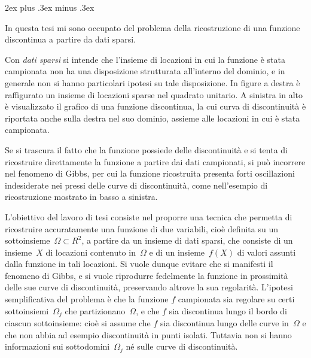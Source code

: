 \def\R{R}

\parindent 0pt
\parskip 2ex plus .3ex minus .3ex

In questa tesi mi sono occupato del problema della ricostruzione di una funzione discontinua a partire da dati sparsi.

Con {\em dati sparsi} si intende che l'insieme di locazioni in cui la funzione è stata campionata non ha una disposizione strutturata all'interno del dominio, e in generale non si hanno particolari ipotesi su tale disposizione. In figure a destra è raffigurato un insieme di locazioni sparse nel quadrato unitario.
A sinistra in alto è visualizzato il grafico di una funzione discontinua, la cui curva di discontinuità è riportata anche sulla destra nel suo dominio, assieme alle locazioni in cui è stata campionata. 

Se si trascura il fatto che la funzione possiede delle discontinuità e si tenta di ricostruire direttamente la funzione a partire dai dati campionati, si può incorrere nel fenomeno di Gibbs, per cui la funzione ricostruita presenta forti oscillazioni indesiderate nei pressi delle curve di discontinuità, come nell'esempio di ricostruzione mostrato in basso a sinistra.  



L'obiettivo del lavoro di tesi consiste nel proporre una tecnica che permetta di ricostruire accuratamente una funzione di due variabili, cioè definita su un sottoinsieme~$\Omega\subset\R^2$, a partire da un insieme di dati sparsi, che consiste di un insieme~$X$ di locazioni contenuto in~$\Omega$ e di un insieme~$f(X)$ di valori assunti dalla funzione in tali locazioni.  Si vuole dunque evitare che si manifesti il fenomeno di Gibbs, e si vuole riprodurre fedelmente la funzione in prossimità delle sue curve di discontinuità, preservando altrove la sua regolarità.  L'ipotesi semplificativa del problema è che la funzione $f$ campionata sia regolare su certi sottoinsiemi~$\Omega_j$ che partizionano~$\Omega$, e che $f$ sia discontinua lungo il bordo di ciascun sottoinsieme:  cioè si assume che $f$ sia discontinua lungo delle curve in~$\Omega$ e che non abbia ad esempio discontinuità in punti isolati.  Tuttavia non si hanno informazioni sui sottodomini~$\Omega_j$ né sulle curve di discontinuità.


